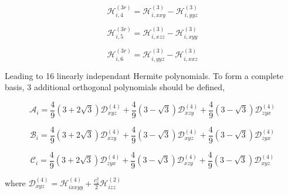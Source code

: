\begin{equation}
    \mathcal{H}_{i,4}^{(3r)} = \mathcal{H}_{i,xxy}^{(3)} - \mathcal{H}_{i,yyz}^{(3)}
\end{equation}

\begin{equation}
    \mathcal{H}_{i,5}^{(3r)} = \mathcal{H}_{i,xzz}^{(3)} - \mathcal{H}_{i,xyy}^{(3)}
\end{equation}

\begin{equation}
    \mathcal{H}_{i,6}^{(3r)} = \mathcal{H}_{i,yyz}^{(3)} - \mathcal{H}_{i,xxz}^{(3)}
\end{equation}

Leading to 16 linearly independant Hermite polynomials. To form a complete basis, 3 additional orthogonal polynomials should be defined,

\begin{equation}
    \mathcal{A}_i = \frac{4}{9}(3 + 2\sqrt{3})\mathcal{D}_{xyz}^{(4)} + \frac{4}{9}(3 -\sqrt{3})\mathcal{D}_{xzy}^{(4)} + \frac{4}{9}(3 - \sqrt{3})\mathcal{D}_{zyx}^{(4)} 
\end{equation}

\begin{equation}
    \mathcal{B}_i = \frac{4}{9}(3 + 2\sqrt{3})\mathcal{D}_{xzy}^{(4)} + \frac{4}{9}(3 -\sqrt{3})\mathcal{D}_{xyz}^{(4)} + \frac{4}{9}(3 - \sqrt{3})\mathcal{D}_{zyx}^{(4)} 
\end{equation}

\begin{equation}
    \mathcal{C}_i = \frac{4}{9}(3 + 2\sqrt{3})\mathcal{D}_{zyx}^{(4)} + \frac{4}{9}(3 -\sqrt{3})\mathcal{D}_{xzy}^{(4)} + \frac{4}{9}(3 - \sqrt{3})\mathcal{D}_{xyz}^{(4)} 
\end{equation}

where $\mathcal{D}_{xyz}^{(4)} = \mathcal{H}_{ixxyy}^{(4)} + \frac{c_s^2}{2}\mathcal{H}_{izz}^{(2)}$

